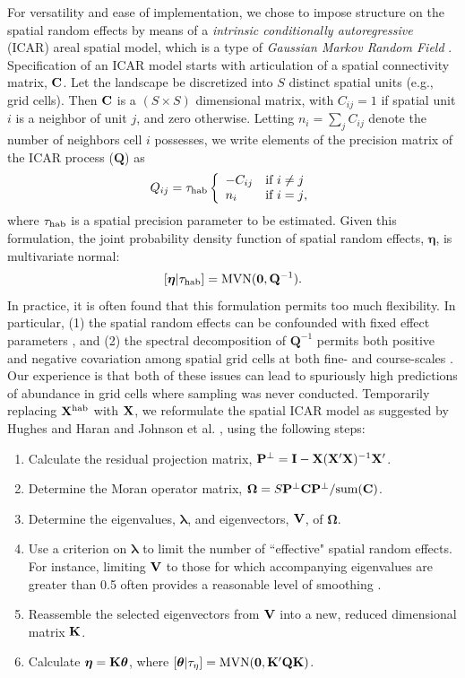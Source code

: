 \documentclass[10pt]{article}
\newcommand{\bn}{\ensuremath{\boldsymbol{\eta}}}
\newcommand{\bQ}{\ensuremath{\mathbf{Q}}}
\begin{document}
For versatility and ease of implementation, we chose to impose structure on the spatial random effects by means of a \emph{intrinsic conditionally autoregressive} (ICAR) areal spatial model, which is a type of \emph{Gaussian Markov Random Field} \cite{BesagEtAl1991,BesagKooperberg1995,RueHeld2005}.   Specification of an ICAR model starts with articulation of a spatial connectivity matrix, ${\bf C}$.  Let the landscape be discretized into $S$ distinct spatial units (e.g., grid cells).  Then ${\bf C}$ is a $(S \times S)$ dimensional matrix, with $C_{ij}=1$ if spatial unit $i$ is a neighbor of unit $j$, and zero otherwise.  Letting $n_i=\sum_j C_{ij}$ denote the number of neighbors cell $i$ possesses,
we write elements of the precision matrix of the ICAR process ($\bQ$) as
$$
Q_{ij} = \tau_{\rm hab}\left\{\begin{array}{ll}
				-C_{ij} & \mbox{if $i\ne j$}\\
				n_i & \mbox{if $i=j$,}
				\end{array}\right.
$$
where $\tau_{\rm hab}$ is a spatial precision parameter to be estimated.
Given this formulation, the joint probability density function of spatial random effects, $\bn$, is multivariate normal:
$$
[\bn|\tau_{\rm hab}] = {\rm MVN}(\mathbf{0},\bQ^{-1}).
$$
In practice, it is often found that this formulation permits too much flexibility.  In particular, (1) the spatial random effects can be confounded with fixed effect parameters \cite{ReichEtAl2006,HodgesReich2010}, and (2) the spectral decomposition
of $\bQ^{-1}$ permits both positive and negative covariation among spatial grid cells at both fine- and course-scales \cite{HughesHaran2012}.  Our experience is that both of these issues can lead to spuriously high predictions of abundance in grid cells where sampling was never conducted.  Temporarily replacing ${\bf X}^{\rm hab}$ with ${\bf X}$, we reformulate the spatial ICAR model as suggested by Hughes and Haran \cite{HughesHaran2012} and Johnson et al. \cite{JohnsonEtAl2012}, using the following steps:
\begin{enumerate}
 \item Calculate the residual projection matrix, ${\bf P}^\bot = {\bf I}-{\bf X}({\bf X}^\prime{\bf X})^{-1}{\bf X}^\prime$.
 \item Determine the Moran operator matrix, $\boldsymbol{\Omega}=S {\bf P}^\bot {\bf C}{\bf P}^\bot / {\rm sum}({\bf C})$.
 \item Determine the eigenvalues, $\boldsymbol{\lambda}$, and eigenvectors, ${\bf V}$, of $\boldsymbol{\Omega}$.
 \item Use a criterion on $\boldsymbol{\lambda}$ to limit the number of ``effective" spatial random effects.  For instance, limiting ${\bf V}$ to those for which accompanying eigenvalues are greater than 0.5 often provides a reasonable level of smoothing \cite{HughesHaran2012}.
 \item Reassemble the selected eigenvectors from ${\bf V}$ into a new, reduced dimensional matrix ${\bf K}$.
 \item Calculate $\boldsymbol{\eta}={\bf K}\boldsymbol{\theta}$, where $[\boldsymbol{\theta}|\tau_{\eta}]= {\rm MVN}({\bf 0},{\bf K}^\prime \bQ {\bf K})$.
\end{enumerate}
\end{document}
